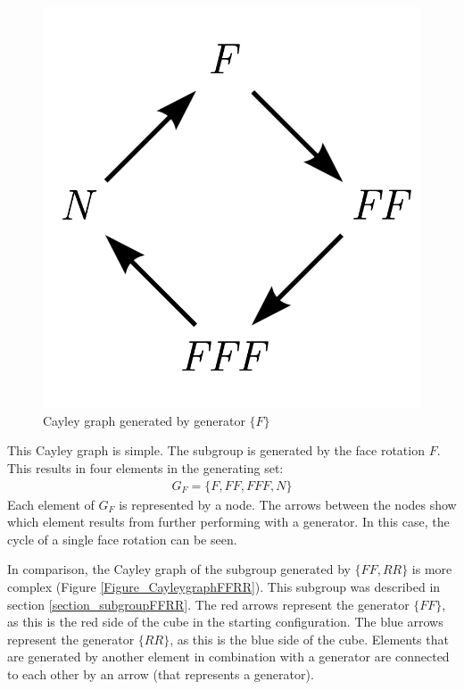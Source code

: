 \documentclass[12pt,a4paper]{article}
\theoremstyle{custom}
\begin{document}
\begin{figure}[H]
\centering
\includegraphics[scale=0.6]{Cayleygraph1.png}
\caption{Cayley graph generated by generator $\{ F \}$}
\label{Figure_CayleygraphF}
\end{figure}

This Cayley graph is simple. 
The subgroup is generated by the face rotation $F$. This results in four elements in the generating set:
\begin{align*}
G_F = \{F, FF, FFF, N\}
\end{align*}
Each element of $G_F$ is represented by a node. The arrows between the nodes show which element results from further performing with a generator. In this case, the cycle of a single face rotation can be seen.


In comparison, the Cayley graph of the subgroup generated by $\{ FF, RR \}$ is more complex (Figure \ref{Figure_CayleygraphFFRR}). This subgroup was described in section \ref{section_subgroupFFRR}.
The red arrows represent the generator $\{FF\}$, as this is the red side of the cube in the starting configuration. The blue arrows represent the generator $\{RR\}$, as this is the blue side of the cube.
Elements that are generated by another element in combination with a generator are connected to each other by an arrow (that represents a generator).
\end{document}
